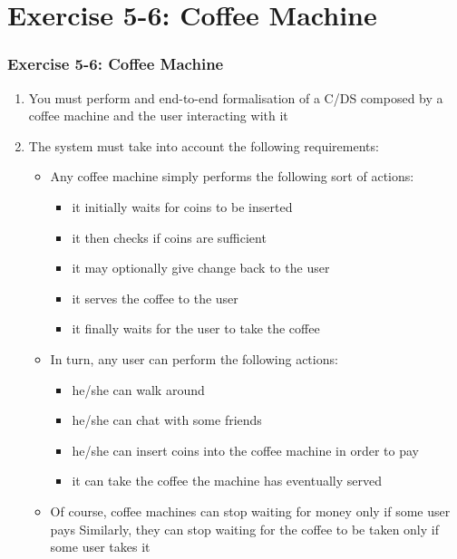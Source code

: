 \documentclass[presentation]{beamer}\mode<presentation>{\usetheme{AMSCesenaPurpleAndGold}}
\begin{document}
\section{Exercise 5-6: Coffee Machine}

\begin{frame}[allowframebreaks]
\frametitle{Exercise 5-6: Coffee Machine}
    
    \begin{enumerate}
        \item You must perform and end-to-end formalisation of a C/DS composed by a coffee machine and the user interacting with it
        
        \item The system must take into account the following requirements:
        \begin{itemize}
            
            \item Any coffee machine simply performs the following sort of actions:
            \begin{itemize}
                \item it initially \alert{waits} for \alert{coins} to be inserted
                \item it then \alert{checks} if coins are sufficient
                \item it may optionally give \alert{change} back to the user
                \item it serves the \alert{coffee} to the user
                \item it finally \alert{waits} for the \alert{user} to take the coffee 
            \end{itemize}
            
            \item In turn, any user can perform the following actions:
            \begin{itemize}
                \item he/she can \alert{walk} around
                \item he/she can \alert{chat} with some friends
                \item he/she can insert coins into the coffee machine in order to \alert{pay}
                \item it can \alert{take} the coffee the machine has eventually served
            \end{itemize}
            
            \item Of course, coffee machines can stop waiting for money only if some user pays 
            Similarly, they can stop waiting for the coffee to be taken only if some user takes it
        \end{itemize}
        

\end{enumerate}
\end{frame}
\end{document}
